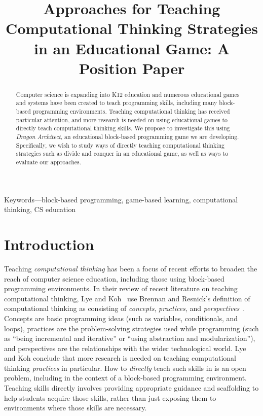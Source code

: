\documentclass[conference]{IEEEtran}
\newcommand*{\TitleFont}{%
  \usefont{\encodingdefault}{\rmdefault}{\seriesdefault}{\shapedefault}%
  \fontsize{22}{30}%
  \selectfont}
\newcommand*{\KeywordFont}{%
  \usefont{\encodingdefault}{\rmdefault}{b}{it}%
  \fontsize{9}{7}%
  \selectfont}
\begin{document}
\title{\TitleFont Approaches for Teaching Computational Thinking Strategies in an Educational Game: A Position Paper}

\author{
  }

\maketitle
\begin{abstract}
Computer science is expanding into K12 education and numerous educational games and systems have been created to teach programming skills, including many block-based programming environments. Teaching computational thinking has received particular attention, and more research is needed on using educational games to directly teach computational thinking skills. We propose to investigate this using \emph{Dragon Architect}, an educational block-based programming game we are developing. Specifically, we wish to study ways of directly teaching computational thinking strategies such as divide and conquer in an educational game, as well as ways to evaluate our approaches. 
\end{abstract}
\vspace{8pt}
{\KeywordFont Keywords---block-based programming, game-based learning, computational thinking, CS education}

\section{Introduction}

Teaching \emph{computational thinking} has been a focus of recent efforts to broaden the reach of computer science education, including those using block-based programming environments. 
In their review of recent literature on teaching computational thinking, Lye and Koh~\cite{lye2014review} use Brennan and Resnick's definition of computational thinking as consisting of \emph{concepts}, \emph{practices}, and \emph{perspectives}~\cite{brennan2012new}. 
Concepts are basic programming ideas (such as variables, conditionals, and loops), practices are the problem-solving strategies used while programming (such as ``being incremental and iterative'' or ``using abstraction and modularization''), and perspectives are the relationships with the wider technological world. 
Lye and Koh conclude that more research is needed on teaching computational thinking \emph{practices} in particular. 
How to \emph{directly} teach such skills in is an open problem, including in the context of a block-based programming environment. 
Teaching skills directly involves providing appropriate guidance and scaffolding to help students acquire those skills, rather than just exposing them to environments where those skills are necessary.
\end{document}
